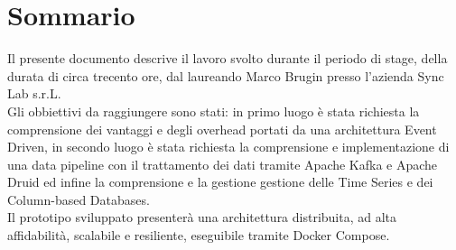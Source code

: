 \cleardoublepage
{}
{}
\begingroup
\let\clearpage\relax
\let\cleardoublepage\relax
\let\cleardoublepage\relax

\chapter*{Sommario}

Il presente documento descrive il lavoro svolto durante il periodo di stage, della durata di circa trecento ore, dal laureando Marco Brugin presso l'azienda Sync Lab  s.r.L.
\\Gli obbiettivi da raggiungere sono stati:
in primo luogo è stata richiesta la comprensione dei vantaggi e degli overhead portati da una architettura Event Driven,
in secondo luogo è stata richiesta la comprensione e implementazione di una data pipeline con il trattamento dei dati tramite Apache Kafka e Apache Druid ed infine la comprensione e la gestione gestione delle Time Series e dei Column-based Databases.
\\Il prototipo sviluppato presenterà una architettura distribuita, ad alta affidabilità, scalabile e resiliente, eseguibile tramite Docker Compose.



\endgroup

\vfill
